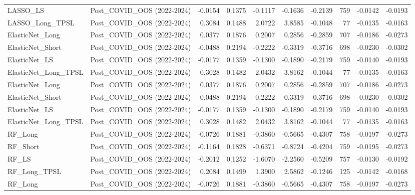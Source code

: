 \begin{tabular}{llrrrrrrrr}
LASSO\_LS & Post\_COVID\_OOS (2022-2024) & -0.0154 & 0.1375 & -0.1117 & -0.1636 & -0.2139 & 759 & -0.0142 & -0.0193 \\
\cline{1-10}
LASSO\_Long\_TPSL & Post\_COVID\_OOS (2022-2024) & 0.3084 & 0.1488 & 2.0722 & 3.8585 & -0.1048 & 77 & -0.0135 & -0.0163 \\
\cline{1-10}
ElasticNet\_Long & Post\_COVID\_OOS (2022-2024) & 0.0377 & 0.1876 & 0.2007 & 0.2856 & -0.2859 & 707 & -0.0186 & -0.0273 \\
\cline{1-10}
ElasticNet\_Short & Post\_COVID\_OOS (2022-2024) & -0.0488 & 0.2194 & -0.2222 & -0.3319 & -0.3716 & 698 & -0.0230 & -0.0302 \\
\cline{1-10}
ElasticNet\_LS & Post\_COVID\_OOS (2022-2024) & -0.0177 & 0.1359 & -0.1300 & -0.1890 & -0.2179 & 759 & -0.0140 & -0.0193 \\
\cline{1-10}
ElasticNet\_Long\_TPSL & Post\_COVID\_OOS (2022-2024) & 0.3028 & 0.1482 & 2.0432 & 3.8162 & -0.1044 & 77 & -0.0135 & -0.0163 \\
\cline{1-10}
ElasticNet\_Long & Post\_COVID\_OOS (2022-2024) & 0.0377 & 0.1876 & 0.2007 & 0.2856 & -0.2859 & 707 & -0.0186 & -0.0273 \\
\cline{1-10}
ElasticNet\_Short & Post\_COVID\_OOS (2022-2024) & -0.0488 & 0.2194 & -0.2222 & -0.3319 & -0.3716 & 698 & -0.0230 & -0.0302 \\
\cline{1-10}
ElasticNet\_LS & Post\_COVID\_OOS (2022-2024) & -0.0177 & 0.1359 & -0.1300 & -0.1890 & -0.2179 & 759 & -0.0140 & -0.0193 \\
\cline{1-10}
ElasticNet\_Long\_TPSL & Post\_COVID\_OOS (2022-2024) & 0.3028 & 0.1482 & 2.0432 & 3.8162 & -0.1044 & 77 & -0.0135 & -0.0163 \\
\cline{1-10}
RF\_Long & Post\_COVID\_OOS (2022-2024) & -0.0726 & 0.1881 & -0.3860 & -0.5665 & -0.4307 & 758 & -0.0197 & -0.0273 \\
\cline{1-10}
RF\_Short & Post\_COVID\_OOS (2022-2024) & -0.1164 & 0.1828 & -0.6371 & -0.8724 & -0.4204 & 759 & -0.0195 & -0.0273 \\
\cline{1-10}
RF\_LS & Post\_COVID\_OOS (2022-2024) & -0.2012 & 0.1252 & -1.6070 & -2.2560 & -0.5209 & 757 & -0.0130 & -0.0192 \\
\cline{1-10}
RF\_Long\_TPSL & Post\_COVID\_OOS (2022-2024) & 0.2084 & 0.1499 & 1.3900 & 2.5862 & -0.1246 & 125 & -0.0142 & -0.0168 \\
\cline{1-10}
RF\_Long & Post\_COVID\_OOS (2022-2024) & -0.0726 & 0.1881 & -0.3860 & -0.5665 & -0.4307 & 758 & -0.0197 & -0.0273 \\

\end{tabular}
